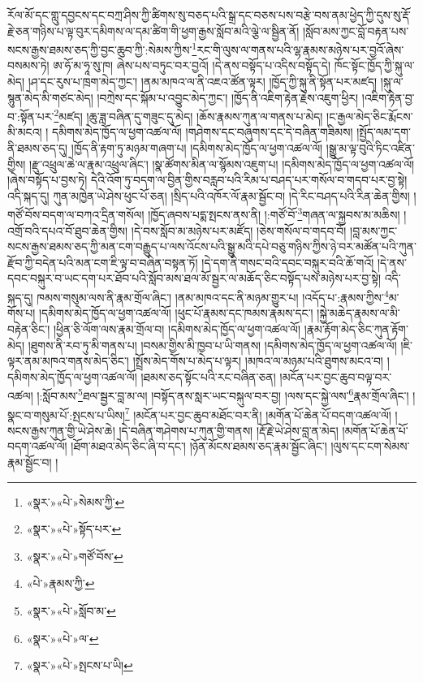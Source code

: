 རོལ་མོ་དང་གླུ་དབྱངས་དང་བཀྲ་ཤིས་ཀྱི་ཚིགས་སུ་བཅད་པའི་སྒྲ་དང་བཅས་པས་བརྩེ་བས་ནམ་ཕྱེད་ཀྱི་དུས་སུ་རྡོ་རྗེ་ཅན་གཉིས་པ་ལྟ་བུར་དམིགས་ལ་དམ་ཚིག་གི་ཕྱག་རྒྱས་སློབ་མའི་ལྕེ་ལ་སྦྱིན་ནོ། །སློབ་མས་ཀྱང་བློ་བརྟན་པས་སངས་རྒྱས་ཐམས་ཅད་ཀྱི་བྱང་ཆུབ་ཀྱི་:སེམས་ཀྱིས་\footnote{«སྣར་»«པེ་»སེམས་ཀྱི་}རང་གི་ལུས་ལ་གནས་པའི་ལྷ་རྣམས་མཉེས་པར་བྱའོ་ཞེས་བསམས་ཏེ། ཨ་ཧོ་མ་ཧཱ་སུ་ཁ། ཞེས་པས་བཏུང་བར་བྱའོ། །དེ་ནས་བསྟོད་པ་འདིས་བསྟོད་དེ། ཁོང་སྟོང་ཁྱོད་ཀྱི་སྐུ་ལ་མེད། །ཤ་དང་རུས་པ་ཁྲག་མེད་ཀྱང་། །ནམ་མཁའ་ལ་ནི་འཇའ་ཚོན་ལྟར། །ཁྱོད་ཀྱི་སྐུ་ནི་སྟོན་པར་མཛད། །སྐུ་ལ་སྙུན་མེད་མི་གཙང་མེད། །བཀྲེས་དང་སྐོམ་པ་འབྱུང་མེད་ཀྱང་། །ཁྱོད་ནི་འཇིག་རྟེན་རྗེས་འཇུག་ཕྱིར། །འཇིག་རྟེན་བྱ་བ་:སྟོན་པར་\footnote{«སྣར་»«པེ་»སྟོད་པར་}མཛད། །ཆུ་ཟླ་བཞིན་དུ་གཟུང་དུ་མེད། །ཆོས་རྣམས་ཀུན་ལ་གནས་པ་མེད། །ང་རྒྱལ་མེད་ཅིང་རྨོངས་མི་མངའ། །
དམིགས་མེད་ཁྱོད་ལ་ཕྱག་འཚལ་ལོ། །གཤེགས་དང་བཞུགས་དང་དེ་བཞིན་གཟིམས། །སྤྱོད་ལམ་དག་ནི་ཐམས་ཅད་དུ། །ཁྱོད་ནི་རྟག་ཏུ་མཉམ་གཞག་པ། །དམིགས་མེད་ཁྱོད་ལ་ཕྱག་འཚལ་ལོ། །སྒྱུ་མ་ལྟ་བུའི་ཏིང་འཛིན་གྱིས། །རྫུ་འཕྲུལ་ཆེ་ལ་རྣམ་འཕྲུལ་ཞིང་། །སྣ་ཚོགས་མིན་ལ་སྙོམས་འཇུག་པ། །དམིགས་མེད་ཁྱོད་ལ་ཕྱག་འཚལ་ལོ། །ཞེས་བསྟོད་པ་བྱས་ཏེ། དེའི་འོག་ཏུ་བདག་ལ་བྱིན་གྱིས་བརླབ་པའི་རིམ་པ་བཤད་པར་གསོལ་བ་གདབ་པར་བྱ་སྟེ། འདི་སྐད་དུ། ཀུན་མཁྱེན་ཡེ་ཤེས་ཕུང་པོ་ཅན། །སྲིད་པའི་འཁོར་ལོ་རྣམ་སྦྱོང་བ། །དེ་རིང་བཤད་པའི་རིན་ཆེན་གྱིས། །གཙོ་བོས་བདག་ལ་བཀའ་དྲིན་གསོལ། །ཁྱོད་ཞབས་པདྨ་སྤངས་ནས་ནི། །:གཙོ་བོ་\footnote{«སྣར་»«པེ་»གཙོ་བོས་}གཞན་ལ་སྐྱབས་མ་མཆིས། །འགྲོ་བའི་དཔའ་བོ་ཐུབ་ཆེན་གྱིས། །དེ་བས་སློབ་མ་མཉེས་པར་མཛོད། །ཅེས་གསོལ་བ་གདབ་བོ། །བླ་མས་ཀྱང་སངས་རྒྱས་ཐམས་ཅད་ཀྱི་མན་ངག་བརྒྱུད་པ་ལས་འོངས་པའི་སྒྱུ་མའི་དཔེ་བཅུ་གཉིས་ཀྱིས་ཉེ་བར་མཚོན་པའི་ཀུན་རྫོབ་ཀྱི་བདེན་པའི་མན་ངག་ཇི་ལྟ་བ་བཞིན་བསྟན་ཏོ། །དེ་དག་ནི་གསང་བའི་དབང་བསྐུར་བའི་ཆོ་གའོ། །དེ་ནས་དབང་བསྐུར་བ་ཡང་དག་པར་ཐོབ་པའི་སློབ་མས་ཐལ་མོ་སྦྱར་ལ་མཆོད་ཅིང་བསྟོད་པས་མཉེས་པར་བྱ་སྟེ། འདི་སྐད་དུ། ཁམས་གསུམ་ལས་ནི་རྣམ་གྲོལ་ཞིང་། །ནམ་མཁའ་དང་ནི་མཉམ་གྱུར་པ། །འདོད་པ་:རྣམས་ཀྱིས་\footnote{«པེ་»རྣམས་ཀྱི་}མ་གོས་པ། །དམིགས་མེད་ཁྱོད་ལ་ཕྱག་འཚལ་ལོ། །ཕུང་པོ་རྣམས་དང་ཁམས་རྣམས་དང་། །སྐྱེ་མཆེད་རྣམས་ལ་མི་བརྟེན་ཅིང་། །ཕྱིན་ཅི་ལོག་ལས་རྣམ་གྲོལ་བ། །དམིགས་མེད་ཁྱོད་ལ་ཕྱག་འཚལ་ལོ། །རྣམ་རྟོག་མེད་ཅིང་ཀུན་རྟོག་མེད། །ཐུགས་ནི་རབ་ཏུ་མི་གནས་པ། །བསམ་གྱིས་མི་ཁྱབ་པ་ཡི་གནས། །དམིགས་མེད་ཁྱོད་ལ་ཕྱག་འཚལ་ལོ། །ཇི་ལྟར་ནམ་མཁའ་གནས་མེད་ཅིང་། །སྤྲོས་མེད་གོས་པ་མེད་པ་ལྟར། །མཁའ་ལ་མཉམ་པའི་ཐུགས་མངའ་བ། །དམིགས་མེད་ཁྱོད་ལ་ཕྱག་འཚལ་ལོ། །ཐམས་ཅད་སྟོང་པའི་རང་བཞིན་ཅན། །མངོན་པར་བྱང་ཆུབ་བལྟ་བར་འཚལ། །:སློབ་མས་\footnote{«སྣར་»«པེ་»སློབ་མ་}ཐལ་སྦྱར་བླ་མ་ལ། །བསྟོད་ནས་སླར་ཡང་བསྐུལ་བར་བྱ། །ལས་དང་སྐྱེ་ལས་\footnote{«སྣར་»«པེ་»ལ་}རྣམ་གྲོལ་ཞིང་། །སྣང་བ་གསུམ་པོ་:སྤངས་པ་ཡིས།\footnote{«སྣར་»«པེ་»སྤངས་པ་ཡི།} །མངོན་པར་བྱང་ཆུབ་མཐོང་བར་ནི། །མགོན་པོ་ཆེན་པོ་བདག་འཚལ་ལོ། །སངས་རྒྱས་ཀུན་གྱི་ཡེ་ཤེས་ཆེ། །དེ་བཞིན་གཤེགས་པ་ཀུན་གྱི་གནས། །རྡོ་རྗེ་ཡེ་ཤེས་བླ་ན་མེད། །མགོན་པོ་ཆེན་པོ་བདག་འཚལ་ལོ། །ཐོག་མཐའ་མེད་ཅིང་ཞི་བ་དང་། །ཉོན་མོངས་ཐམས་ཅད་རྣམ་སྦྱོང་ཞིང་། །ལུས་དང་ངག་སེམས་རྣམ་སྦྱོང་བ། །
